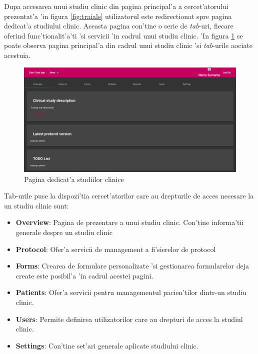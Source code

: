 \documentclass[12pt,a4paper,twoside]{report}
\begin{document}
Dupa accesarea unui studiu clinic din pagina principal'a a cercet'atorului prezentat'a 'in figura \ref{fig:traials} utilizatorul este redirectionat spre pagina dedicat'a studiului clinic. Aceasta pagina con'tine o serie de \emph{tab}-uri, fiecare oferind func'tionalit'a'ti 'si servicii 'in cadrul unui studiu clinic. 'In figura \ref{fig:overview} se poate observa pagina principal'a din cadrul unui studiu clinic 'si \emph{tab}-urile aociate acestuia.

         \begin{figure}[H]
		\begin{center}
			\includegraphics[scale=0.35]{img/trial-overview.png}
			\caption{Pagina dedicat'a studiilor clinice}
  			\label{fig:overview}
  		\end{center}
  		\end{figure}
  Tab-urile puse la dispozi'tia cercet'atorilor care au drepturile de acces necesare la un studiu clinic sunt:
 \begin{itemize}
     \item \textbf{Overview}: Pagina de prezentare a unui studiu clinic. Con'tine informa'tii generale despre un studiu clinic
     \item \textbf{Protocol}: Ofer'a servicii de management a fi'sierelor de protocol
     \item \textbf{Forms}: Crearea de formulare personalizate 'si gestionarea formularelor deja create este posibil'a 'in cadrul acestei pagini.
     \item \textbf{Patients}: Ofer'a servicii pentru managementul pacien'tilor dintr-un studiu clinic.
     \item \textbf{Users}: Permite definirea utilizatorilor care au drepturi de acces la studiul clinic.
     \item \textbf{Settings}: Con'tine set'ari generale aplicate studiului clinic.
 \end{itemize}
\end{document}
